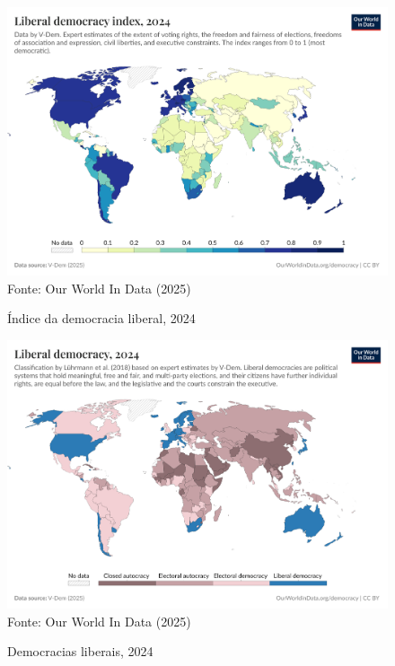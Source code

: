 \begin{figure}[ht]
    \centering
    \caption{Índice da democracia liberal, 2024}
    \includegraphics[width=1\linewidth]{figuras/democracia/liberal-democracy-index.png}
    \label{fig:liberal-democracy-index}
    \footnotesize{Fonte: Our World In Data (2025)}
\end{figure}

\begin{figure}[ht]
    \centering
    \caption{Democracias liberais, 2024}
    \includegraphics[width=1\linewidth]{figuras/democracia/liberal-democracy-row.png}
    \label{fig:liberal-democracy-row}
    \footnotesize{Fonte: Our World In Data (2025)}
\end{figure}

